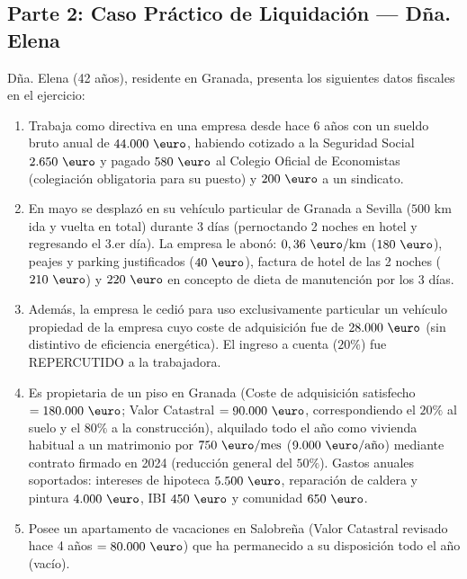 \documentclass[11pt,a4paper,openany]{article}
\begin{document}
\newpage
\subsection{Parte 2: Caso Práctico de Liquidación --- Dña. Elena}

\begin{enunciadoBox}
Dña. Elena (42 años), residente en Granada, presenta los siguientes datos fiscales en el ejercicio:
\begin{enumerate}[label=\textbf{\arabic*)}]
    \item Trabaja como directiva en una empresa desde hace 6 años con un sueldo bruto anual de $44.000\text{ \euro}$, habiendo cotizado a la Seguridad Social $2.650\text{ \euro}$ y pagado $580\text{ \euro}$ al Colegio Oficial de Economistas (colegiación obligatoria para su puesto) y $200\text{ \euro}$ a un sindicato.
    \item En mayo se desplazó en su vehículo particular de Granada a Sevilla ($500\text{ km}$ ida y vuelta en total) durante 3 días (pernoctando 2 noches en hotel y regresando el 3.er día). La empresa le abonó: $0,36\text{ \euro/km}$ ($180\text{ \euro}$), peajes y parking justificados ($40\text{ \euro}$), factura de hotel de las 2 noches ($210\text{ \euro}$) y $220\text{ \euro}$ en concepto de dieta de manutención por los 3 días.
    \item Además, la empresa le cedió para uso exclusivamente particular un vehículo propiedad de la empresa cuyo coste de adquisición fue de $28.000\text{ \euro}$ (sin distintivo de eficiencia energética). El ingreso a cuenta ($20\%$) fue REPERCUTIDO a la trabajadora.
    \item Es propietaria de un piso en Granada (Coste de adquisición satisfecho $= 180.000\text{ \euro}$; Valor Catastral $= 90.000\text{ \euro}$, correspondiendo el $20\%$ al suelo y el $80\%$ a la construcción), alquilado todo el año como vivienda habitual a un matrimonio por $750\text{ \euro/mes}$ ($9.000\text{ \euro/año}$) mediante contrato firmado en 2024 (reducción general del $50\%$). Gastos anuales soportados: intereses de hipoteca $5.500\text{ \euro}$, reparación de caldera y pintura $4.000\text{ \euro}$, IBI $450\text{ \euro}$ y comunidad $650\text{ \euro}$.
    \item Posee un apartamento de vacaciones en Salobreña (Valor Catastral revisado hace 4 años $= 80.000\text{ \euro}$) que ha permanecido a su disposición todo el año (vacío).
\end{enumerate}
\end{enunciadoBox}
\end{document}
